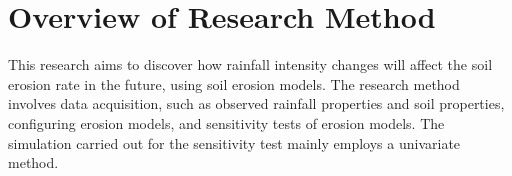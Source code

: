 %
%
%
%
%

\section{Overview of Research Method}
\label{sec:OverviewOfResearchMethods}

This research aims to discover how rainfall intensity changes will affect the
soil erosion rate in the future, using soil erosion models. The research method
involves data acquisition, such as observed rainfall properties and soil
properties, configuring erosion models, and sensitivity tests of erosion
models.
The simulation carried out for the sensitivity test mainly employs a univariate
method.


